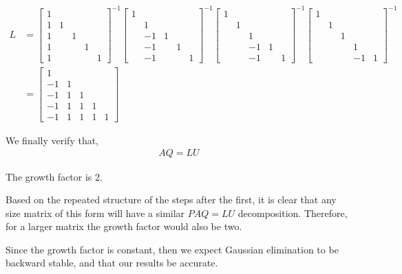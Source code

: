 \documentclass[10pt]{article}
\begin{document}
\begin{solution}[Solution]
\begin{enumerate}
     {\tiny
     \begin{align*}
         L&=
         \left[\begin{array}{rrrrr}
            1 \\
            1 & 1 \\
            1 & & 1 \\
            1 & & & 1 \\
            1 & & & & 1 
         \end{array}\right]^{-1}
        \left[\begin{array}{rrrrr}
            1 \\
            & 1 \\
            & -1 & 1 \\
            & -1 & & 1 \\
            & -1 & & & 1 
        \end{array}\right]^{-1}
        \left[\begin{array}{rrrrr}
            1 \\
            & 1 \\
            & & 1 \\
            & & -1 & 1 \\
            & & -1 &  & 1 
        \end{array}\right]^{-1}
        \left[\begin{array}{rrrrr}
            1 \\
            & 1 \\
            & & 1 \\
            & & & 1 \\
            & & & -1 & 1 
        \end{array}\right]^{-1}
         \\&=
        \left[\begin{array}{rrrrr}
            1 \\
            -1 & 1 \\
            -1 & 1 & 1 \\
            -1 & 1 & 1 & 1 \\
            -1 & 1 & 1 & 1 & 1 
        \end{array}\right]
     \end{align*}
     }

     We finally verify that,
     \begin{align*}
        AQ = LU
     \end{align*}

     The growth factor is 2.

     Based on the repeated structure of the steps after the first, it is clear that any size matrix of this form will have a similar \( PAQ=LU \) decomposition. Therefore, for a larger matrix the growth factor would also be two. 

     Since the growth factor is constant, then we expect Gaussian elimination to be backward stable, and that our results be accurate.

\end{enumerate}

\end{solution}
\end{document}
